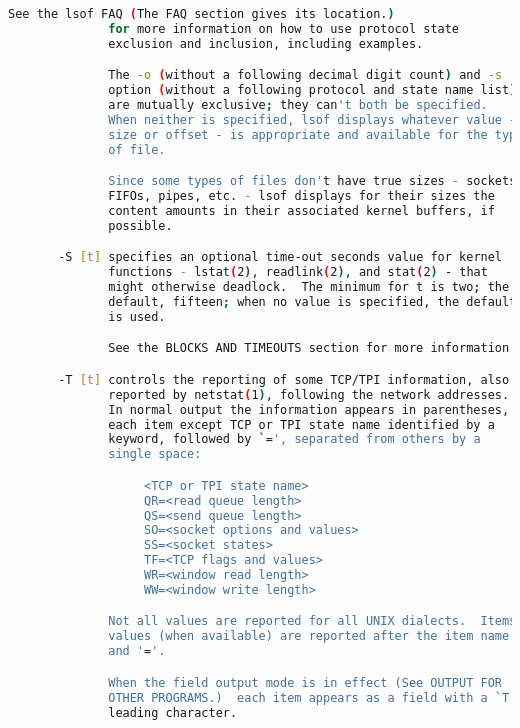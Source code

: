 {{\begin{lstlisting}[language=bash]
              See the lsof FAQ (The FAQ section gives its location.)
              for more information on how to use protocol state
              exclusion and inclusion, including examples.

              The -o (without a following decimal digit count) and -s
              option (without a following protocol and state name list)
              are mutually exclusive; they can't both be specified.
              When neither is specified, lsof displays whatever value -
              size or offset - is appropriate and available for the type
              of file.

              Since some types of files don't have true sizes - sockets,
              FIFOs, pipes, etc. - lsof displays for their sizes the
              content amounts in their associated kernel buffers, if
              possible.

       -S [t] specifies an optional time-out seconds value for kernel
              functions - lstat(2), readlink(2), and stat(2) - that
              might otherwise deadlock.  The minimum for t is two; the
              default, fifteen; when no value is specified, the default
              is used.

              See the BLOCKS AND TIMEOUTS section for more information.

       -T [t] controls the reporting of some TCP/TPI information, also
              reported by netstat(1), following the network addresses.
              In normal output the information appears in parentheses,
              each item except TCP or TPI state name identified by a
              keyword, followed by `=', separated from others by a
              single space:

                   <TCP or TPI state name>
                   QR=<read queue length>
                   QS=<send queue length>
                   SO=<socket options and values>
                   SS=<socket states>
                   TF=<TCP flags and values>
                   WR=<window read length>
                   WW=<window write length>

              Not all values are reported for all UNIX dialects.  Items
              values (when available) are reported after the item name
              and '='.

              When the field output mode is in effect (See OUTPUT FOR
              OTHER PROGRAMS.)  each item appears as a field with a `T'
              leading character.


\end{lstlisting}}}
